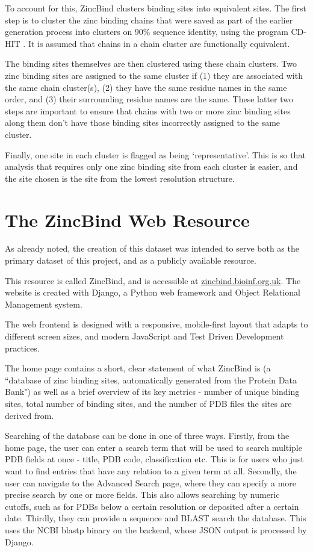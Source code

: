 To account for this, ZincBind clusters binding sites into equivalent sites. The first step is to cluster the zinc binding chains that were saved as part of the earlier generation process into clusters on 90\% sequence identity, using the program CD-HIT . It is assumed that chains in a chain cluster are functionally equivalent.

The binding sites themselves are then clustered using these chain clusters. Two zinc binding sites are assigned to the same cluster if (1) they are associated with the same chain cluster(s), (2) they have the same residue names in the same order, and (3) their surrounding residue names are the same. These latter two steps are important to ensure that chains with two or more zinc binding sites along them don't have those binding sites incorrectly assigned to the same cluster.

Finally, one site in each cluster is flagged as being `representative'. This is so that analysis that requires only one zinc binding site from each cluster is easier, and the site chosen is the site from the lowest resolution structure.

\section{The ZincBind Web Resource}

As already noted, the creation of this dataset was intended to serve both as the primary dataset of this project, and as a publicly available resource.

This resource is called ZincBind, and is accessible at \url{zincbind.bioinf.org.uk}. The website is created with Django, a Python web framework and Object Relational Management system.

The web frontend is designed with a responsive, mobile-first layout that adapts to different screen sizes, and modern JavaScript and Test Driven Development practices.

The home page contains a short, clear statement of what ZincBind is (a ``database of zinc binding sites, automatically generated from the Protein Data Bank") as well as a brief overview of its key metrics - number of unique binding sites, total number of binding sites, and the number of PDB files the sites are derived from.

Searching of the database can be done in one of three ways. Firstly, from the home page, the user can enter a search term that will be used to search multiple PDB fields at once - title, PDB code, classification etc. This is for users who just want to find entries that have any relation to a given term at all. Secondly, the user can navigate to the Advanced Search page, where they can specify a more precise search by one or more fields. This also allows searching by numeric cutoffs, such as for PDBs below a certain resolution or deposited after a certain date. Thirdly, they can provide a sequence and BLAST search the database. This uses the NCBI blastp binary on the backend, whose JSON output is processed by Django.

